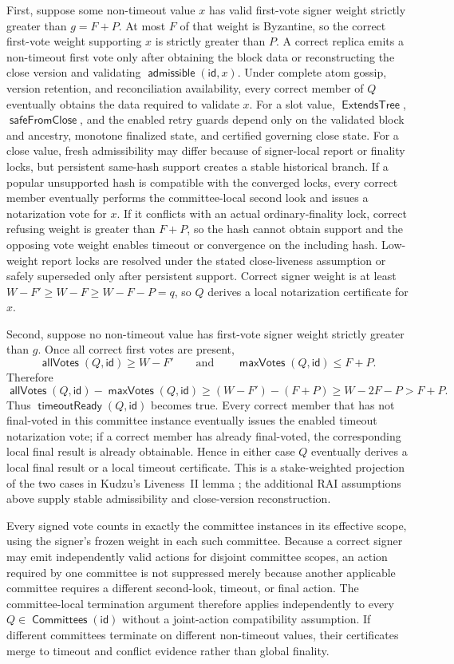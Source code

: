\documentclass[sigplan,twocolumn,review,anonymous]{acmart}
\newcommand{\func}[1]{\operatorname{\mathsf{#1}}}
\newcommand{\allVotes}{\func{allVotes}}
\newcommand{\maxVotes}{\func{maxVotes}}
\newcommand{\id}{\mathsf{id}}
\newcommand{\admissible}{\func{admissible}}
\newcommand{\ExtendsTree}{\func{ExtendsTree}}
\newcommand{\Committees}{\func{Committees}}
\newcommand{\timeoutReady}{\func{timeoutReady}}
\newcommand{\safeFromClose}{\func{safeFromClose}}
\begin{document}
First, suppose some non-timeout value \(x\) has valid first-vote signer weight strictly greater than
\(g=F+P\).  At most \(F\) of that weight is Byzantine, so the correct first-vote weight supporting
\(x\) is strictly greater than \(P\).  A correct replica emits a non-timeout first vote only after
obtaining the block data or reconstructing the close version and validating \(\admissible(\id,x)\).
Under complete atom gossip, version retention, and reconciliation availability, every correct member of
\(Q\) eventually obtains the data required to validate \(x\).  For a slot value, \(\ExtendsTree\),
\(\safeFromClose\), and the enabled retry guards depend only on the validated block and ancestry,
monotone finalized state, and certified governing close state.  For a close value, fresh admissibility may differ because of signer-local report or finality locks, but
persistent same-hash support creates a stable historical branch.  If a popular unsupported hash is
compatible with the converged locks, every correct member eventually performs the committee-local second
look and issues a notarization vote for \(x\).  If it conflicts with an actual ordinary-finality lock,
correct refusing weight is greater than \(F+P\), so the hash cannot obtain support and the opposing vote
weight enables timeout or convergence on the including hash.  Low-weight report locks are resolved under
the stated close-liveness assumption or safely superseded only after persistent support.  Correct signer weight is at least \(W-F'\ge W-F\ge W-F-P=q\), so
\(Q\) derives a local notarization certificate for \(x\).

Second, suppose no non-timeout value has first-vote signer weight strictly greater than \(g\).  Once all
correct first votes are present,
\[
\allVotes(Q,\id)\ge W-F'
\qquad\text{and}\qquad
\maxVotes(Q,\id)\le F+P.
\]
Therefore
\[
\allVotes(Q,\id)-\maxVotes(Q,\id)
\ge (W-F')-(F+P)
\ge W-2F-P
>F+P.
\]
Thus \(\timeoutReady(Q,\id)\) becomes true.  Every correct member that has not final-voted in this
committee instance eventually issues the enabled timeout notarization vote; if a correct member has
already final-voted, the corresponding local final result is already obtainable.  Hence in either case
\(Q\) eventually derives a local final result or a local timeout certificate.  This is a
stake-weighted projection of the two cases in Kudzu's Liveness~II lemma
\cite[Lemma~5.10]{shoup2025kudzu}; the additional RAI assumptions above supply stable admissibility and
close-version reconstruction.

Every signed vote counts in exactly the committee instances in its effective scope, using the signer's
frozen weight in each such committee.  Because a correct signer may emit independently valid actions for
disjoint committee scopes, an action required by one committee is not suppressed merely because another
applicable committee requires a different second-look, timeout, or final action.  The committee-local
termination argument therefore applies independently to every \(Q\in\Committees(\id)\) without a
joint-action compatibility assumption.  If different committees terminate on different non-timeout
values, their certificates merge to timeout and conflict evidence rather than global finality.
\end{document}
